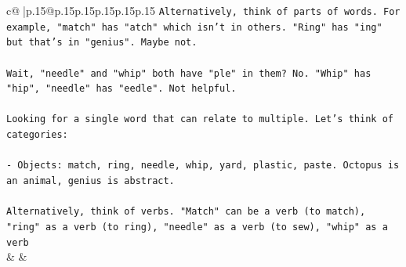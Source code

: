 \documentclass{article}
\begin{document}
{\begin{supertabular}{c@{$\;$}|p{.15\linewidth}@{}p{.15\linewidth}p{.15\linewidth}p{.15\linewidth}p{.15\linewidth}p{.15\linewidth}}
{{{\texttt{Alternatively, think of parts of words. For example, "match" has "atch" which isn't in others. "Ring" has "ing" but that's in "genius". Maybe not.} \\
\\ 
\texttt{Wait, "needle" and "whip" both have "ple" in them? No. "Whip" has "hip", "needle" has "eedle". Not helpful.} \\
\\ 
\texttt{Looking for a single word that can relate to multiple. Let's think of categories:} \\
\\ 
\texttt{{-} Objects: match, ring, needle, whip, yard, plastic, paste. Octopus is an animal, genius is abstract.} \\
\\ 
\texttt{Alternatively, think of verbs. "Match" can be a verb (to match), "ring" as a verb (to ring), "needle" as a verb (to sew), "whip" as a verb} \\
            }
        }
    }
    & & \\ \\


\end{supertabular}}
\end{document}
